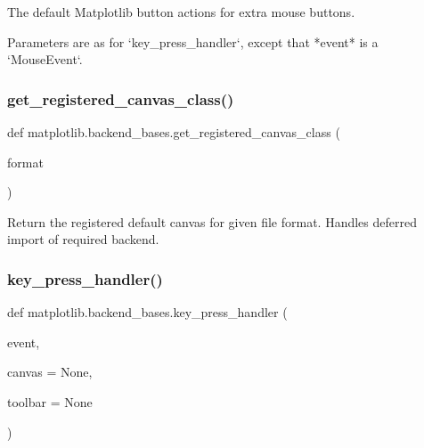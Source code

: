 \begin{DoxyVerb}The default Matplotlib button actions for extra mouse buttons.

Parameters are as for `key_press_handler`, except that *event* is a
`MouseEvent`.
\end{DoxyVerb}
 \mbox{\label{namespacematplotlib_1_1backend__bases_a57f84e94a9fac8a951a7a7e1c3bc4a6e}} 
\subsubsection{\texorpdfstring{get\+\_\+registered\+\_\+canvas\+\_\+class()}{get\_registered\_canvas\_class()}}
{\footnotesize\ttfamily def matplotlib.\+backend\+\_\+bases.\+get\+\_\+registered\+\_\+canvas\+\_\+class (\begin{DoxyParamCaption}\item[{}]{format }\end{DoxyParamCaption})}

\begin{DoxyVerb}Return the registered default canvas for given file format.
Handles deferred import of required backend.
\end{DoxyVerb}
 \mbox{\label{namespacematplotlib_1_1backend__bases_a1ec45458122389c565d08445bf03b167}} 
\subsubsection{\texorpdfstring{key\+\_\+press\+\_\+handler()}{key\_press\_handler()}}
{\footnotesize\ttfamily def matplotlib.\+backend\+\_\+bases.\+key\+\_\+press\+\_\+handler (\begin{DoxyParamCaption}\item[{}]{event,  }\item[{}]{canvas = {\ttfamily None},  }\item[{}]{toolbar = {\ttfamily None} }\end{DoxyParamCaption})}

